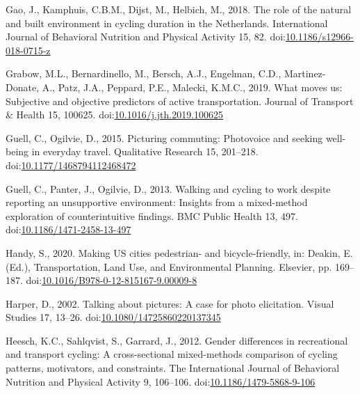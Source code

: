 \documentclass[]{elsarticle} %
\begin{document}
\leavevmode\hypertarget{ref-gaoRoleNaturalBuilt2018}{}%
Gao, J., Kamphuis, C.B.M., Dijst, M., Helbich, M., 2018. The role of the
natural and built environment in cycling duration in the Netherlands.
International Journal of Behavioral Nutrition and Physical Activity 15,
82.
doi:\href{https://doi.org/10.1186/s12966-018-0715-z}{10.1186/s12966-018-0715-z}

\leavevmode\hypertarget{ref-grabowWhatMovesUs2019a}{}%
Grabow, M.L., Bernardinello, M., Bersch, A.J., Engelman, C.D.,
Martinez-Donate, A., Patz, J.A., Peppard, P.E., Malecki, K.M.C., 2019.
What moves us: Subjective and objective predictors of active
transportation. Journal of Transport \& Health 15, 100625.
doi:\href{https://doi.org/10.1016/j.jth.2019.100625}{10.1016/j.jth.2019.100625}

\leavevmode\hypertarget{ref-guellPicturingCommutingPhotovoice2015}{}%
Guell, C., Ogilvie, D., 2015. Picturing commuting: Photovoice and
seeking well-being in everyday travel. Qualitative Research 15,
201--218.
doi:\href{https://doi.org/10.1177/1468794112468472}{10.1177/1468794112468472}

\leavevmode\hypertarget{ref-guellWalkingCyclingWork2013a}{}%
Guell, C., Panter, J., Ogilvie, D., 2013. Walking and cycling to work
despite reporting an unsupportive environment: Insights from a
mixed-method exploration of counterintuitive findings. BMC Public Health
13, 497.
doi:\href{https://doi.org/10.1186/1471-2458-13-497}{10.1186/1471-2458-13-497}

\leavevmode\hypertarget{ref-handyMakingUSCities2020}{}%
Handy, S., 2020. Making US cities pedestrian- and bicycle-friendly, in:
Deakin, E. (Ed.), Transportation, Land Use, and Environmental Planning.
Elsevier, pp. 169--187.
doi:\href{https://doi.org/10.1016/B978-0-12-815167-9.00009-8}{10.1016/B978-0-12-815167-9.00009-8}

\leavevmode\hypertarget{ref-harperTalkingPicturesCase2002}{}%
Harper, D., 2002. Talking about pictures: A case for photo elicitation.
Visual Studies 17, 13--26.
doi:\href{https://doi.org/10.1080/14725860220137345}{10.1080/14725860220137345}

\leavevmode\hypertarget{ref-heeschGenderDifferencesRecreational2012}{}%
Heesch, K.C., Sahlqvist, S., Garrard, J., 2012. Gender differences in
recreational and transport cycling: A cross-sectional mixed-methods
comparison of cycling patterns, motivators, and constraints. The
International Journal of Behavioral Nutrition and Physical Activity 9,
106--106.
doi:\href{https://doi.org/10.1186/1479-5868-9-106}{10.1186/1479-5868-9-106}
\end{document}
